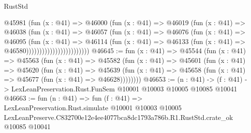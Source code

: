 \begin{lexlean}{RustStd}
\begin{coremodule}
                                @45981
                                  (fun (x : @41) =>
                                  @46000
                                    (fun (x : @41) =>
                                    @46019
                                      (fun (x : @41) =>
                                      @46038
                                        (fun (x : @41) =>
                                        @46057
                                          (fun (x : @41) =>
                                          @46076
                                            (fun (x : @41) =>
                                            @46095
                                              (fun (x : @41) =>
                                              @46114
                                                (fun (x : @41) =>
                                                @46133
                                                  (fun (x : @41) => @46580))))))))))))))))))))))))
@46645 := fun (x : @41) =>
  @45544
    (fun (x : @41) =>
    @45563
      (fun (x : @41) =>
      @45582
        (fun (x : @41) =>
        @45601
          (fun (x : @41) =>
          @45620
            (fun (x : @41) =>
            @45639
              (fun (x : @41) => @45658 (fun (x : @41) => @45677 (fun (x : @41) => @46628))))))))
@46653 := (n : @41) ->
  (f : @41) -> LexLeanPreservation.Rust.FunSem @10001 @10003 @10005 @10085 @10041
@46663 := fun (n : @41) =>
  fun (f : @41) =>
  LexLeanPreservation.Rust.simulate
    @10001
    @10003
    @10005
    LexLeanPreserve.C832700e12e4ee4077bca8dc1793a786b.R1.RustStd.crate_ok
    @10085
    @10041
\end{coremodule}
\end{lexlean}
